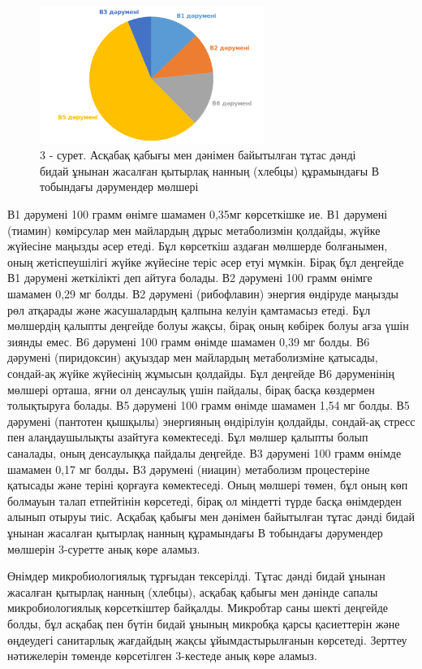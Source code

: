 \begin{figure}[H]
	\centering
	\includegraphics[width=0.65\textwidth]{media/pish2/image28}
	\caption*{3 - сурет. Асқабақ қабығы мен дәнімен байытылған тұтас дәнді бидай ұнынан жасалған қытырлақ нанның (хлебцы) құрамындағы В тобындағы дәрумендер мөлшері}
\end{figure}

\begin{multicols}{2}
В1 дәрумені 100 грамм өнімге шамамен 0,35мг көрсеткішке ие. В1 дәрумені
(тиамин) көмірсулар мен майлардың дұрыс метаболизмін қолдайды, жүйке
жүйесіне маңызды әсер етеді. Бұл көрсеткіш аздаған мөлшерде болғанымен,
оның жетіспеушілігі жүйке жүйесіне теріс әсер етуі мүмкін. Бірақ бұл
деңгейде В1 дәрумені жеткілікті деп айтуға болады. В2 дәрумені 100 грамм
өнімге шамамен 0,29 мг болды. В2 дәрумені (рибофлавин) энергия өндіруде
маңызды рөл атқарады және жасушалардың қалпына келуін қамтамасыз етеді.
Бұл мөлшердің қалыпты деңгейде болуы жақсы, бірақ оның көбірек болуы
ағза үшін зиянды емес. В6 дәрумені 100 грамм өнімде шамамен 0,39 мг
болды. В6 дәрумені (пиридоксин) ақуыздар мен майлардың метаболизміне
қатысады, сондай-ақ жүйке жүйесінің жұмысын қолдайды. Бұл деңгейде В6
дәруменінің мөлшері орташа, яғни ол денсаулық үшін пайдалы, бірақ басқа
көздермен толықтыруға болады. В5 дәрумені 100 грамм өнімде шамамен 1,54
мг болды. В5 дәрумені (пантотен қышқылы) энергияның өндірілуін қолдайды,
сондай-ақ стресс пен алаңдаушылықты азайтуға көмектеседі. Бұл мөлшер
қалыпты болып саналады, оның денсаулыққа пайдалы деңгейде. В3 дәрумені
100 грамм өнімде шамамен 0,17 мг болды{\bfseries .} В3 дәрумені (ниацин)
метаболизм процестеріне қатысады және теріні қорғауға көмектеседі. Оның
мөлшері төмен, бұл оның көп болмауын талап етпейтінін көрсетеді, бірақ
ол міндетті түрде басқа өнімдерден алынып отыруы тиіс. Асқабақ қабығы
мен дәнімен байытылған тұтас дәнді бидай ұнынан жасалған қытырлақ нанның
құрамындағы В тобындағы дәрумендер мөлшерін 3-суретте анық көре аламыз.

Өнімдер микробиологиялық тұрғыдан тексерілді. Тұтас дәнді бидай ұнынан
жасалған қытырлақ нанның (хлебцы), асқабақ қабығы мен дәнінде сапалы
микробиологиялық көрсеткіштер байқалды. Микробтар саны шекті деңгейде
болды, бұл асқабақ пен бүтін бидай ұнының микробқа қарсы қасиеттерін
және өңдеудегі санитарлық жағдайдың жақсы ұйымдастырылғанын көрсетеді.
Зерттеу нәтижелерін төменде көрсетілген 3-кестеде анық көре аламыз.
\end{multicols}

